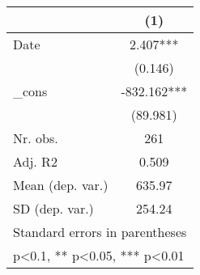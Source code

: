 {
\def\sym#1{\ifmmode^{#1}\else\(^{#1}\)\fi}
\begin{tabular}{l*{1}{c}}
\hline\hline
            &\multicolumn{1}{c}{(1)}   \\
\hline
Date        &       2.407***\\
            &     (0.146)   \\
[1em]
\_cons      &    -832.162***\\
            &    (89.981)   \\
\hline
Nr. obs.    &         261   \\
Adj. R2     &       0.509   \\
Mean (dep. var.)&      635.97   \\
SD (dep. var.)&      254.24   \\
\hline\hline
\multicolumn{2}{l}{\footnotesize Standard errors in parentheses}\\
\multicolumn{2}{l}{\footnotesize * p<0.1, ** p<0.05, *** p<0.01}\\
\end{tabular}
}
